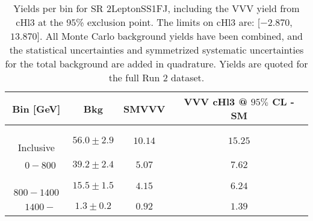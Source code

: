 \begin{table}[!htbp]
    \small
    \center
    \begin{tabular}{c||c|c|c}
    Bin [GeV] & Bkg & SMVVV & \pbox{20cm}{VVV \\ cHl3 @ $95\%$ CL - SM \\ }\\
    \hline
    \pbox{20cm}{ ~ \\Inclusive\\ } & $56.0 \pm 2.9$ & $10.14$ & $15.25$\\
    \hline
    \pbox{20cm}{ ~ \\$0-800$\\ } & $39.2 \pm 2.4$ & $5.07$ & $7.62$\\
    \hline
    \pbox{20cm}{ ~ \\$800-1400$\\ } & $15.5 \pm 1.5$ & $4.15$ & $6.24$\\
    \hline
    \pbox{20cm}{ ~ \\$1400-$\\ } & $1.3 \pm 0.2$ & $0.92$ & $1.39$\\
\end{tabular}
    \caption{Yields per bin for SR 2LeptonSS1FJ, including the VVV yield from cHl3 at the $95$\% exclusion point. The limits on cHl3 are: [$-2.870$,~$13.870$]. All Monte Carlo background yields have been combined, and the statistical uncertainties and symmetrized systematic uncertainties for the total background are added in quadrature. Yields are quoted for the full Run 2 dataset.}
    \label{tab:2LeptonSS1FJ$binssignal}
\end{table}
